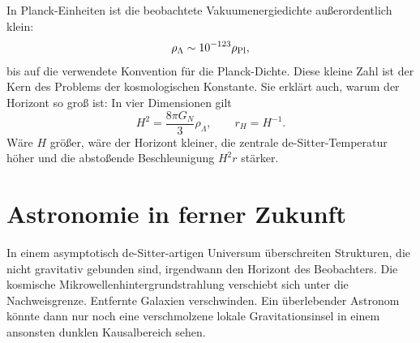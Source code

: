 In Planck-Einheiten ist die beobachtete Vakuumenergiedichte außerordentlich klein:
\begin{equation}
\rho_\Lambda\sim10^{-123}\rho_{\rm Pl},
\label{eq:l09-planck-smallness}
\end{equation}
bis auf die verwendete Konvention für die Planck-Dichte. Diese kleine Zahl ist der Kern des Problems der kosmologischen Konstante. Sie erklärt auch, warum der Horizont so groß ist: In vier Dimensionen gilt
\begin{equation}
H^2=\frac{8\pi G_N}{3}\rho_\Lambda,
\qquad
r_H=H^{-1}.
\end{equation}
Wäre \(H\) größer, wäre der Horizont kleiner, die zentrale de-Sitter-Temperatur höher und die abstoßende Beschleunigung \(H^2r\) stärker.

\begin{classroomqa}
\end{classroomqa}

\begin{classroomqa}
\end{classroomqa}

\section{Astronomie in ferner Zukunft}

In einem asymptotisch de-Sitter-artigen Universum überschreiten Strukturen, die nicht gravitativ gebunden sind, irgendwann den Horizont des Beobachters. Die kosmische Mikrowellenhintergrundstrahlung verschiebt sich unter die Nachweisgrenze. Entfernte Galaxien verschwinden. Ein überlebender Astronom könnte dann nur noch eine verschmolzene lokale Gravitationsinsel in einem ansonsten dunklen Kausalbereich sehen.


